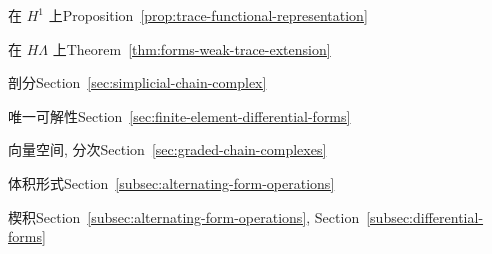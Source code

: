 \begin{theindex}
\subitem {}\label{index:trace-operator-on-h-1}{在 $H^1$ 上}\quad Proposition~\ref{prop:trace-functional-representation}

\subitem {}\label{index:trace-operator-on-h-lambda}{在 $H\Lambda$ 上}\quad Theorem~\ref{thm:forms-weak-trace-extension}

\item {}\label{index:triangulation}{剖分}\quad Section~\ref{sec:simplicial-chain-complex}

\item {}\label{index:unisolvence}{唯一可解性}\quad Section~\ref{sec:finite-element-differential-forms}

\item {}\label{index:vector-space-graded}{向量空间, 分次}\quad Section~\ref{sec:graded-chain-complexes}

\item {}\label{index:volume-form}{体积形式}\quad Section~\ref{subsec:alternating-form-operations}

\item {}\label{index:wedge-product}{楔积}\quad Section~\ref{subsec:alternating-form-operations}, Section~\ref{subsec:differential-forms}
\end{theindex}
